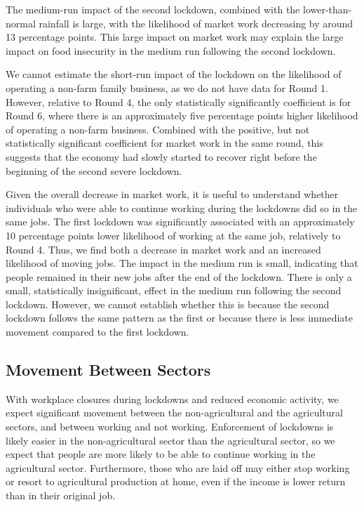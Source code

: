 \documentclass{wber}
\begin{document}
The medium-run impact of the second lockdown, combined with the
lower-than-normal rainfall is large, with the likelihood of market work
decreasing by around 13 percentage points. This large impact on market
work may explain the large impact on food insecurity in the medium run
following the second lockdown.

We cannot estimate the short-run impact of the lockdown on the
likelihood of operating a non-farm family business, as we do not have
data for Round 1. However, relative to Round 4, the only statistically
significantly coefficient is for Round 6, where there is an
approximately five percentage points higher likelihood of operating a
non-farm business. Combined with the positive, but not statistically
significant coefficient for market work in the same round, this suggests
that the economy had slowly started to recover right before the
beginning of the second severe lockdown.

Given the overall decrease in market work, it is useful to understand
whether individuals who were able to continue working during the
lockdowns did so in the same jobs. The first lockdown was significantly
associated with an approximately 10 percentage points lower likelihood
of working at the same job, relatively to Round 4. Thus, we find both a
decrease in market work and an increased likelihood of moving jobs. The
impact in the medium run is small, indicating that people remained in
their new jobs after the end of the lockdown. There is only a small,
statistically insignificant, effect in the medium run following the
second lockdown. However, we cannot establish whether this is because
the second lockdown follows the same pattern as the first or because
there is less immediate movement compared to the first lockdown.

\subsection{Movement Between Sectors}\label{movement-between-sectors}

With workplace closures during lockdowns and reduced economic activity,
we expect significant movement between the non-agricultural and the
agricultural sectors, and between working and not working. Enforcement
of lockdowns is likely easier in the non-agricultural sector than the
agricultural sector, so we expect that people are more likely to be able
to continue working in the agricultural sector. Furthermore, those who
are laid off may either stop working or resort to agricultural
production at home, even if the income is lower return than in their
original job.
\end{document}
